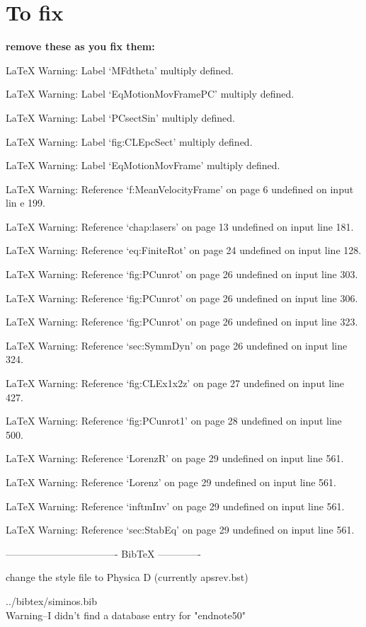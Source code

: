 
\section*{To fix}

{\bf remove these as you fix them:}


LaTeX Warning: Label `MFdtheta' multiply defined.


LaTeX Warning: Label `EqMotionMovFramePC' multiply defined.


LaTeX Warning: Label `PCsectSin' multiply defined.


LaTeX Warning: Label `fig:CLEpcSect' multiply defined.


LaTeX Warning: Label `EqMotionMovFrame' multiply defined.

LaTeX Warning: Reference `f:MeanVelocityFrame' on page 6 undefined on input lin
e 199.


LaTeX Warning: Reference `chap:lasers' on page 13 undefined on input line 181.


LaTeX Warning: Reference `eq:FiniteRot' on page 24 undefined on input line 128.


LaTeX Warning: Reference `fig:PCunrot' on page 26 undefined on input line 303.


LaTeX Warning: Reference `fig:PCunrot' on page 26 undefined on input line 306.


LaTeX Warning: Reference `fig:PCunrot' on page 26 undefined on input line 323.


LaTeX Warning: Reference `sec:SymmDyn' on page 26 undefined on input line 324.


LaTeX Warning: Reference `fig:CLEx1x2z' on page 27 undefined on input line 427.


LaTeX Warning: Reference `fig:PCunrot1' on page 28 undefined on input line 500.


LaTeX Warning: Reference `LorenzR' on page 29 undefined on input line 561.


LaTeX Warning: Reference `Lorenz' on page 29 undefined on input line 561.


LaTeX Warning: Reference `inftmInv' on page 29 undefined on input line 561.


LaTeX Warning: Reference `sec:StabEq' on page 29 undefined on input line 561.

---------------------------------- BibTeX -------------


change the style file to Physica D (currently apsrev.bst)

../bibtex/siminos.bib
\\
Warning--I didn't find a database entry for "endnote50"

